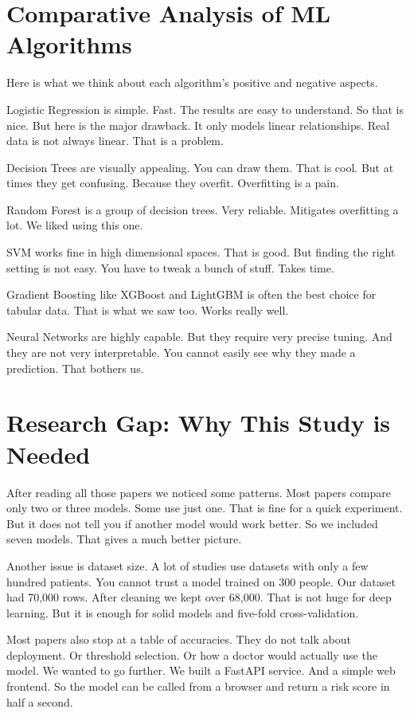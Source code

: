 \documentclass[12pt, a4paper, oneside]{book}
\begin{document}
\section{Comparative Analysis of ML Algorithms}
Here is what we think about each algorithm's positive and negative aspects.

Logistic Regression is simple. Fast. The results are easy to understand. So that is nice. But here is the major drawback. It only models linear relationships. Real data is not always linear. That is a problem.

Decision Trees are visually appealing. You can draw them. That is cool. But at times they get confusing. Because they overfit. Overfitting is a pain.

Random Forest is a group of decision trees. Very reliable. Mitigates overfitting a lot. We liked using this one.

SVM works fine in high dimensional spaces. That is good. But finding the right setting is not easy. You have to tweak a bunch of stuff. Takes time.

Gradient Boosting like XGBoost and LightGBM is often the best choice for tabular data. That is what we saw too. Works really well.

Neural Networks are highly capable. But they require very precise tuning. And they are not very interpretable. You cannot easily see why they made a prediction. That bothers us.

\section{Research Gap: Why This Study is Needed}
After reading all those papers we noticed some patterns. Most papers compare only two or three models. Some use just one. That is fine for a quick experiment. But it does not tell you if another model would work better. So we included seven models. That gives a much better picture.

Another issue is dataset size. A lot of studies use datasets with only a few hundred patients. You cannot trust a model trained on 300 people. Our dataset had 70,000 rows. After cleaning we kept over 68,000. That is not huge for deep learning. But it is enough for solid models and five-fold cross-validation.

Most papers also stop at a table of accuracies. They do not talk about deployment. Or threshold selection. Or how a doctor would actually use the model. We wanted to go further. We built a FastAPI service. And a simple web frontend. So the model can be called from a browser and return a risk score in half a second.
\end{document}

